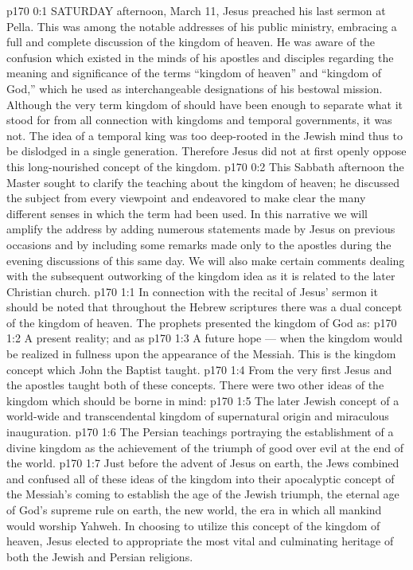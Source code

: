 \vs p170 0:1 SATURDAY afternoon, March 11, Jesus preached his last sermon at Pella. This was among the notable addresses of his public ministry, embracing a full and complete discussion of the kingdom of heaven. He was aware of the confusion which existed in the minds of his apostles and disciples regarding the meaning and significance of the terms “kingdom of heaven” and “kingdom of God,” which he used as interchangeable designations of his bestowal mission. Although the very term kingdom of  should have been enough to separate what it stood for from all connection with  kingdoms and temporal governments, it was not. The idea of a temporal king was too deep\hyp{}rooted in the Jewish mind thus to be dislodged in a single generation. Therefore Jesus did not at first openly oppose this long\hyp{}nourished concept of the kingdom.
\vs p170 0:2 This Sabbath afternoon the Master sought to clarify the teaching about the kingdom of heaven; he discussed the subject from every viewpoint and endeavored to make clear the many different senses in which the term had been used. In this narrative we will amplify the address by adding numerous statements made by Jesus on previous occasions and by including some remarks made only to the apostles during the evening discussions of this same day. We will also make certain comments dealing with the subsequent outworking of the kingdom idea as it is related to the later Christian church.
\vs p170 1:1 In connection with the recital of Jesus’ sermon it should be noted that throughout the Hebrew scriptures there was a dual concept of the kingdom of heaven. The prophets presented the kingdom of God as:
\vs p170 1:2 \bibnobreakspace A present reality; and as
\vs p170 1:3 \pc {}\bibnobreakspace A future hope --- when the kingdom would be realized in fullness upon the appearance of the Messiah. This is the kingdom concept which John the Baptist taught.
\vs p170 1:4 From the very first Jesus and the apostles taught both of these concepts. There were two other ideas of the kingdom which should be borne in mind:
\vs p170 1:5 \pc {}\bibnobreakspace The later Jewish concept of a world\hyp{}wide and transcendental kingdom of supernatural origin and miraculous inauguration.
\vs p170 1:6 \pc {}\bibnobreakspace The Persian teachings portraying the establishment of a divine kingdom as the achievement of the triumph of good over evil at the end of the world.
\vs p170 1:7 \pc Just before the advent of Jesus on earth, the Jews combined and confused all of these ideas of the kingdom into their apocalyptic concept of the Messiah’s coming to establish the age of the Jewish triumph, the eternal age of God’s supreme rule on earth, the new world, the era in which all mankind would worship Yahweh. In choosing to utilize this concept of the kingdom of heaven, Jesus elected to appropriate the most vital and culminating heritage of both the Jewish and Persian religions.
